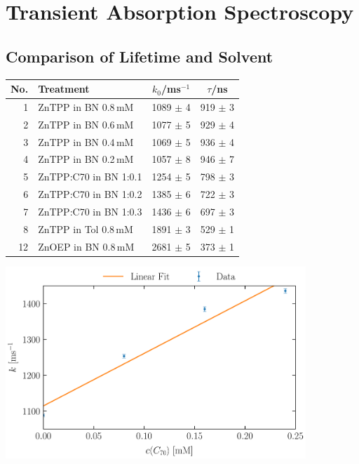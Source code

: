 \section{Transient Absorption Spectroscopy}
\label{sec:transient}

\subsection{Comparison of Lifetime and Solvent}
\label{sub:comparison}

\begin{center}
    \captionsetup{type = table}
    \begin{tabular}{r | l | c c}
        No. & Treatment             & $k_0$/ms$^{-1}$ & $\tau$/ns   \\\hline
        1   & ZnTPP in BN 0.8\,mM   & 1089 $\pm$ 4 & 919 $\pm$ 3 \\
        2   & ZnTPP in BN 0.6\,mM   & 1077 $\pm$ 5 & 929 $\pm$ 4 \\
        3   & ZnTPP in BN 0.4\,mM   & 1069 $\pm$ 5 & 936 $\pm$ 4 \\
        4   & ZnTPP in BN 0.2\,mM   & 1057 $\pm$ 8 & 946 $\pm$ 7 \\
        5   & ZnTPP:C70 in BN 1:0.1 & 1254 $\pm$ 5 & 798 $\pm$ 3 \\
        6   & ZnTPP:C70 in BN 1:0.2 & 1385 $\pm$ 6 & 722 $\pm$ 3 \\
        7   & ZnTPP:C70 in BN 1:0.3 & 1436 $\pm$ 6 & 697 $\pm$ 3 \\
        8   & ZnTPP in Tol 0.8\,mM  & 1891 $\pm$ 3 & 529 $\pm$ 1 \\
        12  & ZnOEP in BN 0.8\,mM   & 2681 $\pm$ 5 & 373 $\pm$ 1 \\
    \end{tabular}
    \label{tab:lifetimeDecay}
\end{center}



\begin{center}
    \captionsetup{type = figure}
    \includegraphics[width = 0.85\textwidth]{Pictures/Evaluation/42/Concentration.pdf}
    \label{fig:concentration}
\end{center}

